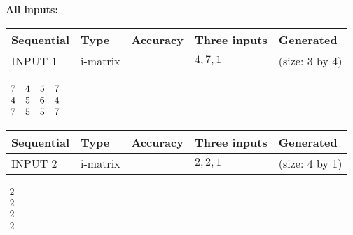 \documentclass[12pt]{article}
\begin{document}
   
\noindent\vspace{0.1in}\hspace{-0.08in} {\textbf{\Large{All inputs: }}}
   
   
  
  
\noindent\begin{tabular}{|l|l|l|l|l|}
\hline
 Sequential & Type & Accuracy & Three inputs & Generated \\ 
\hline
 
 
  INPUT $           1$ & i-matrix &  & $
 4
 , 
 7
 , 
 1
 $ & (size:           3 by           4)
 \\  \hline  
 \end{tabular}
   
   
 $\begin{array}{
 c
 c
 c
 c
 }
           7 & 
           4 & 
           5 & 
           7 \\ 
           4 & 
           5 & 
           6 & 
           4 \\ 
           7 & 
           5 & 
           5 & 
           7
\end{array}  $ 
  
  
\noindent\begin{tabular}{|l|l|l|l|l|}
\hline
 Sequential & Type & Accuracy & Three inputs & Generated \\ 
\hline
 
 
  INPUT $           2$ & i-matrix &  & $
 2
 , 
 2
 , 
 1
 $ & (size:           4 by           1)
 \\  \hline  
 \end{tabular}
   
   
 $\begin{array}{
 c
 }
           2 \\ 
           2 \\ 
           2 \\ 
           2
\end{array}  $ 
  
\end{document}
